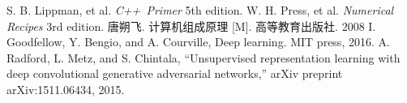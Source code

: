 \begin{thebibliography}{99}
S. B. Lippman, et al. \textsl{C++ Primer} 5th edition. 
W. H. Press, et al. \textsl{Numerical Recipes} 3rd edition. 
唐朔飞. 计算机组成原理 [M]. 高等教育出版社. 2008
I. Goodfellow, Y. Bengio, and A. Courville, Deep learning. MIT press, 2016.
A. Radford, L. Metz, and S. Chintala, “Unsupervised representation learning with deep convolutional generative adversarial networks,” arXiv preprint arXiv:1511.06434, 2015.

\end{thebibliography}
